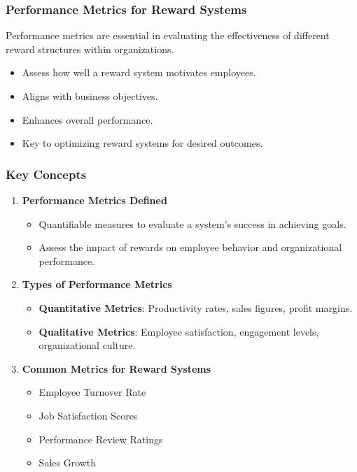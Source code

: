 \documentclass[aspectratio=169]{beamer}
\begin{document}
\begin{frame}[fragile]
    \frametitle{Performance Metrics for Reward Systems}
    Performance metrics are essential in evaluating the effectiveness of different reward structures within organizations. 
    \begin{itemize}
        \item Assess how well a reward system motivates employees.
        \item Aligns with business objectives.
        \item Enhances overall performance.
        \item Key to optimizing reward systems for desired outcomes.
    \end{itemize}
\end{frame}

\begin{frame}[fragile]
    \frametitle{Key Concepts}
    \begin{enumerate}
        \item \textbf{Performance Metrics Defined}
        \begin{itemize}
            \item Quantifiable measures to evaluate a system's success in achieving goals.
            \item Assess the impact of rewards on employee behavior and organizational performance.
        \end{itemize}

        \item \textbf{Types of Performance Metrics}
        \begin{itemize}
            \item \textbf{Quantitative Metrics}: Productivity rates, sales figures, profit margins.
            \item \textbf{Qualitative Metrics}: Employee satisfaction, engagement levels, organizational culture.
        \end{itemize}
        
        \item \textbf{Common Metrics for Reward Systems}
        \begin{itemize}
            \item Employee Turnover Rate
            \item Job Satisfaction Scores
            \item Performance Review Ratings
            \item Sales Growth
        \end{itemize}
    \end{enumerate}
\end{frame}
\end{document}
